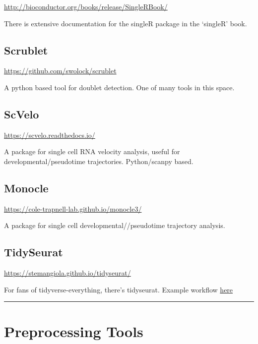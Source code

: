 \documentclass[
]{book}
\begin{document}
\url{http://bioconductor.org/books/release/SingleRBook/}

There is extensive documentation for the singleR package in the `singleR' book.

\subsection*{Scrublet}\label{scrublet}

\url{https://github.com/swolock/scrublet}

A python based tool for doublet detection. One of many tools in this space.

\subsection*{ScVelo}\label{scvelo}

\url{https://scvelo.readthedocs.io/}

A package for single cell RNA velocity analysis, useful for developmental/pseudotime trajectories. Python/scanpy based.

\subsection*{Monocle}\label{monocle}

\url{https://cole-trapnell-lab.github.io/monocle3/}

A package for single cell developmental//pseudotime trajectory analysis.

\subsection*{TidySeurat}\label{tidyseurat}

\url{https://stemangiola.github.io/tidyseurat/}

For fans of tidyverse-everything, there's tidyseurat. Example workflow \href{https://tidytranscriptomics-workshops.github.io/bioc2022_tidytranscriptomics/articles/tidytranscriptomics_case_study.html}{here}

\begin{center}\rule{0.5\linewidth}{0.5pt}\end{center}

\section{Preprocessing Tools}\label{preprocessing-tools}
\end{document}
